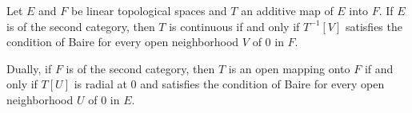 Let $E$ and $F$ be linear topological spaces and $T$ an additive map of $E$ into $F$. If $E$ is of the second category, then $T$ is continuous if and only if $T^{-1}[V]$ satisfies the condition of Baire for every open neighborhood $V$ of 0 in $F$.

Dually, if $F$ is of the second category, then $T$ is an open mapping onto $F$ if and only if $T[U]$ is radial at 0 and satisfies the condition of Baire for every open neighborhood $U$ of 0 in $E$.
